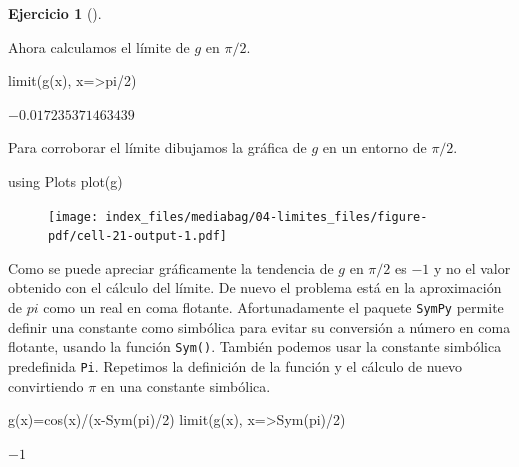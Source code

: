 \documentclass[
  a4paper,
]{scrreport}
\newenvironment{Shaded}{\begin{snugshade}}{\end{snugshade}}
\newcommand{\BuiltInTok}[1]{\textcolor[rgb]{0.00,0.23,0.31}{#1}}
\newcommand{\ConstantTok}[1]{\textcolor[rgb]{0.56,0.35,0.01}{#1}}
\newcommand{\FloatTok}[1]{\textcolor[rgb]{0.68,0.00,0.00}{#1}}
\newcommand{\FunctionTok}[1]{\textcolor[rgb]{0.28,0.35,0.67}{#1}}
\newcommand{\ImportTok}[1]{\textcolor[rgb]{0.00,0.46,0.62}{#1}}
\newcommand{\NormalTok}[1]{\textcolor[rgb]{0.00,0.23,0.31}{#1}}
\newcommand{\OperatorTok}[1]{\textcolor[rgb]{0.37,0.37,0.37}{#1}}
\theoremstyle{definition}
\newtheorem{exercise}{Ejercicio}[chapter]
\theoremstyle{remark}
\begin{document}
\begin{exercise}[]
\begin{enumerate}
\begin{tcolorbox}
  Ahora calculamos el límite de \(g\) en \(\pi/2\).

\begin{Shaded}
\begin{Highlighting}[]
\FunctionTok{limit}\NormalTok{(}\FunctionTok{g}\NormalTok{(x), x}\OperatorTok{=\textgreater{}}\ConstantTok{pi}\OperatorTok{/}\FloatTok{2}\NormalTok{)}
\end{Highlighting}
\end{Shaded}

  $-0.017235371463439$

  Para corroborar el límite dibujamos la gráfica de \(g\) en un entorno
  de \(\pi/2\).

\begin{Shaded}
\begin{Highlighting}[]
\ImportTok{using} \BuiltInTok{Plots}
\FunctionTok{plot}\NormalTok{(g)}
\end{Highlighting}
\end{Shaded}

  \begin{figure}[H]

  {\centering \texttt{[image: index\_files/mediabag/04-limites\_files/figure-pdf/cell-21-output-1.pdf]}

  }

  \end{figure}

  Como se puede apreciar gráficamente la tendencia de \(g\) en \(\pi/2\)
  es \(-1\) y no el valor obtenido con el cálculo del límite. De nuevo
  el problema está en la aproximación de \(pi\) como un real en coma
  flotante. Afortunadamente el paquete \texttt{SymPy} permite definir
  una constante como simbólica para evitar su conversión a número en
  coma flotante, usando la función \texttt{Sym()}. También podemos usar
  la constante simbólica predefinida \texttt{Pi}. Repetimos la
  definición de la función y el cálculo de nuevo convirtiendo \(\pi\) en
  una constante simbólica.

\begin{Shaded}
\begin{Highlighting}[]
\FunctionTok{g}\NormalTok{(x)}\OperatorTok{=}\FunctionTok{cos}\NormalTok{(x)}\OperatorTok{/}\NormalTok{(}\FunctionTok{x{-}Sym}\NormalTok{(}\ConstantTok{pi}\NormalTok{)}\OperatorTok{/}\FloatTok{2}\NormalTok{)}
\FunctionTok{limit}\NormalTok{(}\FunctionTok{g}\NormalTok{(x), x}\OperatorTok{=\textgreater{}}\FunctionTok{Sym}\NormalTok{(}\ConstantTok{pi}\NormalTok{)}\OperatorTok{/}\FloatTok{2}\NormalTok{)}
\end{Highlighting}
\end{Shaded}

  $-1$

  \end{tcolorbox}
\end{enumerate}

\end{exercise}
\end{document}

